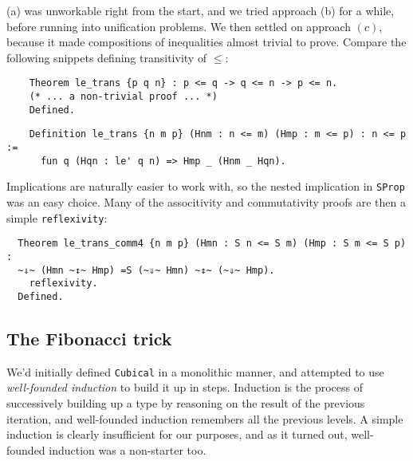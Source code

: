 \documentclass[10pt]{art}
\renewcommand{\c}{\ensuremath{(c)}}
\begin{document}
(a) was unworkable right from the start, and we tried approach (b) for a while, before running into unification problems. We then settled on approach \c, because it made compositions of inequalities almost trivial to prove. Compare the following snippets defining transitivity of $\leq$:

\begin{listing}[H]
  \begin{verbatim}
    Theorem le_trans {p q n} : p <= q -> q <= n -> p <= n.
    (* ... a non-trivial proof ... *)
    Defined.
  \end{verbatim}
  \caption{\texttt{le_trans} when $\leq$ is defined using an inductive approach}
\end{listing}

\begin{listing}[H]
  \begin{verbatim}
    Definition le_trans {n m p} (Hnm : n <= m) (Hmp : m <= p) : n <= p :=
      fun q (Hqn : le' q n) => Hmp _ (Hnm _ Hqn).
  \end{verbatim}
  \caption{\texttt{le_trans} when $\leq$ is defined using a nested implication}
\end{listing}

Implications are naturally easier to work with, so the nested implication in \texttt{SProp} was an easy choice. Many of the associtivity and commutativity proofs are then a simple \texttt{reflexivity}:

\begin{listing}[H]
  \begin{verbatim}
  Theorem le_trans_comm4 {n m p} (Hmn : S n <= S m) (Hmp : S m <= S p) :
  ~⇓~ (Hmn ~↕~ Hmp) =S (~⇓~ Hmn) ~↕~ (~⇓~ Hmp).
    reflexivity.
  Defined.
  \end{verbatim}
\end{listing}

\subsection{The Fibonacci trick}
We'd initially defined \texttt{Cubical} in a monolithic manner, and attempted to use \emph{well-founded induction} to build it up in steps. Induction is the process of successively building up a type by reasoning on the result of the previous iteration, and well-founded induction remembers all the previous levels. A simple induction is clearly insufficient for our purposes, and as it turned out, well-founded induction was a non-starter too.
\end{document}
